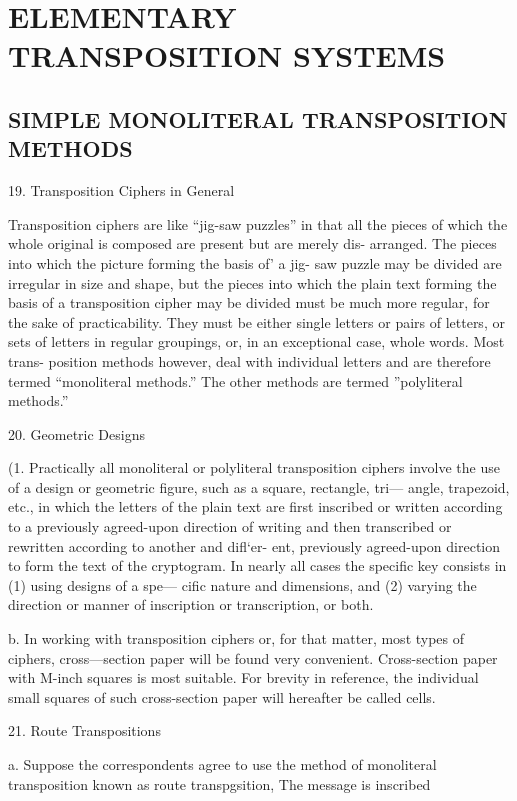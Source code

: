 \chapter{ELEMENTARY TRANSPOSITION SYSTEMS}

 

\section{SIMPLE MONOLITERAL TRANSPOSITION METHODS}

19. Transposition Ciphers in General

Transposition ciphers are like “jig-saw puzzles” in that all the pieces
of which the whole original is composed are present but are merely dis-
arranged. The pieces into which the picture forming the basis of' a jig-
saw puzzle may be divided are irregular in size and shape, but the pieces
into which the plain text forming the basis of a transposition cipher may
be divided must be much more regular, for the sake of practicability.
They must be either single letters or pairs of letters, or sets of letters in
regular groupings, or, in an exceptional case, whole words. Most trans-
position methods however, deal with individual letters and are therefore
termed “monoliteral methods.” The other methods are termed ”polyliteral
methods.”

20. Geometric Designs

(1. Practically all monoliteral or polyliteral transposition ciphers involve
the use of a design or geometric ﬁgure, such as a square, rectangle, tri—
angle, trapezoid, etc., in which the letters of the plain text are ﬁrst
inscribed or written according to a previously agreed-upon direction of
writing and then transcribed or rewritten according to another and diﬂ‘er-
ent, previously agreed-upon direction to form the text of the cryptogram.
In nearly all cases the speciﬁc key consists in (1) using designs of a spe—
ciﬁc nature and dimensions, and (2) varying the direction or manner of
inscription or transcription, or both.

b. In working with transposition ciphers or, for that matter, most
types of ciphers, cross—section paper will be found very convenient.
Cross-section paper with M-inch squares is most suitable. For brevity in
reference, the individual small squares of such cross-section paper will
hereafter be called cells.

21. Route Transpositions

a. Suppose the correspondents agree to use the method of monoliteral
transposition known as route transpgsition, The message is inscribed


